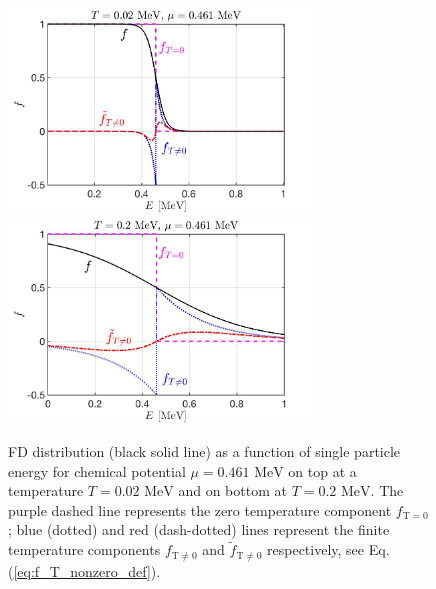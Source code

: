\documentclass[sn-mathphys,Numbered]{sn-jnl}
\newcommand{\req}[1]{Eq.\,(\ref{#1})}
\newcommand*{\MeV}{\text{ MeV}}
\newcommand*{\xgreen}{\color{green}}
\begin{document}
\begin{figure}%
\centering
\includegraphics[width=0.72\textwidth]{./plot/FermiZeorFiniteTemperature}\\
\includegraphics[width=0.72\textwidth]{./plot/FermiZeroFiniteTemperature002}
\caption{
FD distribution (black solid line) as a function of single particle energy for chemical potential $\mu=0.461\MeV$ on top at a temperature $T=0.02\MeV$ and on bottom at $T=0.2\MeV$.  The purple dashed line represents the zero temperature component $f_{\mathrm{T}=0}$; blue (dotted) and red (dash-dotted) lines represent the finite temperature components $f_\mathrm{T\neq0}$ and $\widetilde f_\mathrm{T\neq0}$ respectively, see \req{eq:f_T_nonzero_def}.
}
\label{Fermi_Component}
\end{figure}

\end{document}
